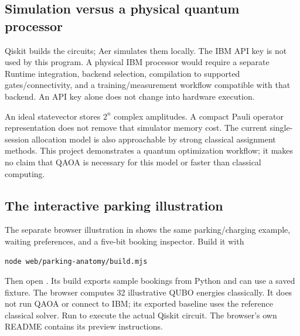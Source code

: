 \subsection{Simulation versus a physical quantum processor}
Qiskit builds the circuits; Aer simulates them locally. The IBM API key is not
used by this program. A physical IBM processor would require a separate Runtime
integration, backend selection, compilation to supported gates/connectivity,
and a training/measurement workflow compatible with that backend. An API key
alone does not change  into hardware execution.

An ideal statevector stores $2^n$ complex amplitudes. A compact Pauli operator
representation does not remove that simulator memory cost. The current
single-session allocation model is also approachable by strong classical
assignment methods. This project demonstrates a quantum optimization workflow;
it makes no claim that QAOA is necessary for this model or faster than classical
computing.

\subsection{The interactive parking illustration}
The separate browser illustration in  shows the same
parking/charging example, waiting preferences, and a five-bit booking inspector.
Build it with
\begin{lstlisting}
node web/parking-anatomy/build.mjs
\end{lstlisting}
Then open . Its build exports sample
bookings from Python and can use a saved fixture. The browser computes 32
illustrative QUBO energies classically. It does not run QAOA or connect to IBM;
its exported baseline uses the reference classical solver. Run 
to execute the actual Qiskit circuit. The browser's own README contains its
preview instructions.

